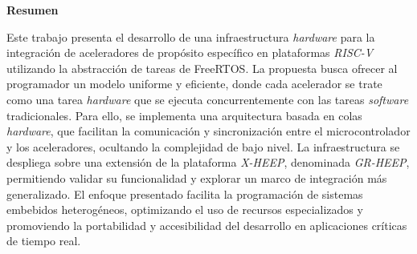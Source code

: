 \thispagestyle{empty}

\parindent=16mm

\vspace*{2cm}

\begin{flushleft}
  \begin{Large}
    \textbf{Resumen}\\
  \end{Large}
  \masterRule
\end{flushleft}

\vspace*{1cm}

Este trabajo presenta el desarrollo de una infraestructura \textit{hardware} para la integración de aceleradores de propósito específico en plataformas \textit{RISC-V} utilizando la abstracción de tareas de FreeRTOS. La propuesta busca ofrecer al programador un modelo uniforme y eficiente, donde cada acelerador se trate como una tarea \textit{hardware} que se ejecuta concurrentemente con las tareas \textit{software} tradicionales. Para ello, se implementa una arquitectura basada en colas \textit{hardware}, que facilitan la comunicación y sincronización entre el microcontrolador y los aceleradores, ocultando la complejidad de bajo nivel. La infraestructura se despliega sobre una extensión de la plataforma \textit{X-HEEP}, denominada \textit{GR-HEEP}, permitiendo validar su funcionalidad y explorar un marco de integración más generalizado. El enfoque presentado facilita la programación de sistemas embebidos heterogéneos, optimizando el uso de recursos especializados y promoviendo la portabilidad y accesibilidad del desarrollo en aplicaciones críticas de tiempo real.